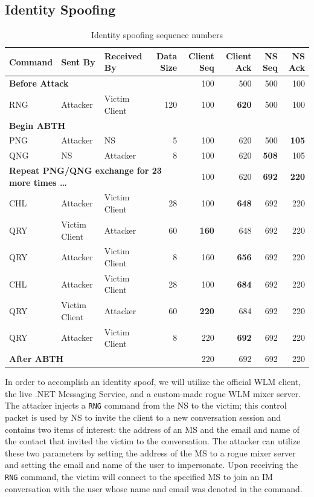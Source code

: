 \documentclass{sig-alternate}
\begin{document}
\subsection{Identity Spoofing}

\begin{table}[tbp]
	\centering

	\caption{Identity spoofing sequence numbers}
	\label{tab:identityspoof}

	\begin{tabular}{l l l r r r r r}
		\hline
		\hline
		\textbf{Command} & \textbf{Sent By} & \textbf{Received By} & \textbf{Data Size} & \textbf{Client Seq} & \textbf{Client Ack} & \textbf{NS Seq} & \textbf{NS Ack} \\
		\hline
		\multicolumn{4}{l}{\textbf{Before Attack}} & 100 & 500 & 500 & 100 \\
		RNG & Attacker & Victim Client & 120 & 100 & \textbf{620} & 500 & 100 \\
		\multicolumn{8}{l}{\textbf{Begin ABTH}} \\
		PNG & Attacker & NS & 5 & 100 & 620 & 500 & \textbf{105} \\
		QNG & NS & Attacker & 8 & 100 & 620 & \textbf{508} & 105 \\
		\multicolumn{4}{l}{\textbf{Repeat PNG/QNG exchange for 23 more times \dots}} & 100 & 620 & \textbf{692} & \textbf{220} \\
		CHL & Attacker & Victim Client & 28 & 100 & \textbf{648} & 692 & 220 \\
		QRY & Victim Client & Attacker & 60 & \textbf{160} & 648 & 692 & 220 \\
		QRY & Attacker & Victim Client & 8 & 160 & \textbf{656} & 692 & 220 \\
		CHL & Attacker & Victim Client & 28 & 100 & \textbf{684} & 692 & 220 \\
		QRY & Victim Client & Attacker & 60 & \textbf{220} & 684 & 692 & 220 \\
		QRY & Attacker & Victim Client & 8 & 220 & \textbf{692} & 692 & 220 \\
		\hline
		\hline
		\multicolumn{4}{l}{\textbf{After ABTH}} & 220 & 692 & 692 & 220 \\
	\end{tabular}
\end{table}

In order to accomplish an identity spoof, we will utilize the official WLM client, the live .NET Messaging Service, and a custom-made rogue WLM mixer server. 
The attacker injects a \texttt{RNG} command from the NS to the victim; this control packet is used by NS to invite the client to a new conversation session and contains two items of interest: the address of an MS and the email and name of the contact that invited the victim to the conversation.
The attacker can utilize these two parameters by setting the address of the MS to a rogue mixer server and setting the email and name of the user to impersonate.
Upon receiving the \texttt{RNG} command, the victim will connect to the specified MS to join an IM conversation with the user whose name and email was denoted in the command.
\end{document}
